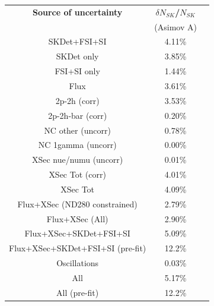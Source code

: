 

\begin{table}[htb]
\centering
\begin{tabular}{| c | c | c |}
\hline
  {\bf Source of uncertainty}    & \multicolumn{1}{c|}{{\bf ${\delta}N_{SK}$/$N_{SK}$}}\\
                                 & \multicolumn{1}{c|}{(Asimov A)}\\

\hline
\hline
SKDet+FSI+SI                   & 4.11\%                        \\
SKDet only                   & 3.85\%                        \\
FSI+SI only                   & 1.44\%                        \\
\hline
\hline
  Flux                           & 3.61\%                        \\
\hline
\hline
  2p-2h (corr)                     & 3.53\%                        \\
  2p-2h-bar (corr)                  & 0.20\%                        \\
  NC other (uncorr)              & 0.78\%                        \\
  NC 1gamma (uncorr)             & 0.00\%                        \\
  XSec nue/numu (uncorr)                 & 0.01\%                        \\
\hline
  XSec Tot (corr)                  & 4.01\%                        \\
  XSec Tot                       & 4.09\%                        \\
\hline
\hline
  Flux+XSec (ND280 constrained)                      & 2.79\%                        \\
  Flux+XSec  (All)                    & 2.90\%                        \\
\hline
  Flux+XSec+SKDet+FSI+SI         & 5.09\%                        \\
  Flux+XSec+SKDet+FSI+SI (pre-fit)         & 12.2\%                        \\
\hline
\hline
  Oscillations                   & 0.03\%                        \\
\hline
\hline
  All                            & 5.17\%                        \\
  All (pre-fit) 		& 12.2\%				\\
\hline


\end{tabular}
\end{table}
